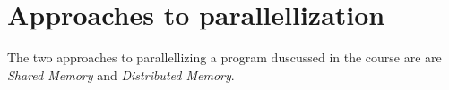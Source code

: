 
\section{Approaches to parallellization} %
\label{sec:approaches_to_parallellization}

The two approaches to parallellizing a program duscussed in the course are are \emph{Shared Memory} and \emph{Distributed Memory}.



